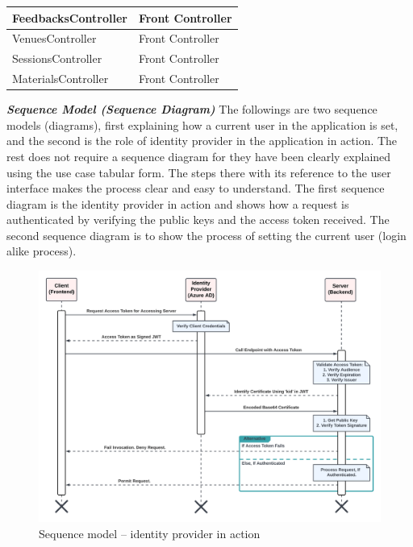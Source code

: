 \begin{justify}
\begin{table}[H]
\begin{tabular}{|p{7.25cm}|p{7.25cm}|}
\hline
FeedbacksController                                   & Front Controller         \\ 
\hline
VenuesController                                      & Front Controller         \\ 
\hline
SessionsController                                    & Front Controller         \\ 
\hline
MaterialsController                                   & Front Controller         \\
\hline
\end{tabular}
\end{table}


\vspace{0.25cm}
\newendline \textbf{\textit{Sequence Model (Sequence Diagram)}}\newendline
The followings are two sequence models (diagrams), first explaining how a current user in the application is set, and the second is the role of identity provider in the application in action. The rest does not require a sequence diagram for they have been clearly explained using the use case tabular form. The steps there with its reference to the user interface makes the process clear and easy to understand.\newendline
The first sequence diagram is the identity provider in action and shows how a request is authenticated by verifying the public keys and the access token received. The second sequence diagram is to show the process of setting the current user (login alike process).

\begin{figure}[H]
    \centerline{\includegraphics[width=150mm,scale=1]{figures/analysis_and_design/design/1. Identity Provider In Action.png}}
    \caption{Sequence model -- identity provider in action}
    \label{identityProvider}
\end{figure}


\end{justify}
